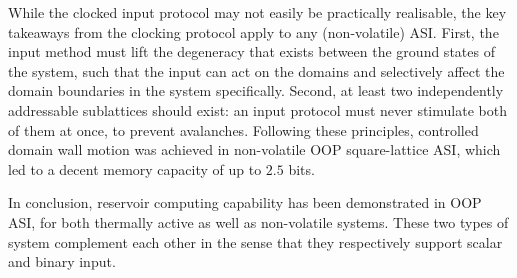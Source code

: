 While the clocked input protocol may not easily be practically realisable, the key takeaways from the clocking protocol apply to any (non-volatile) ASI.
First, the input method must lift the degeneracy that exists between the ground states of the system, such that the input can act on the domains and selectively affect the domain boundaries in the system specifically.
Second, at least two independently addressable sublattices should exist: an input protocol must never stimulate both of them at once, to prevent avalanches.
Following these principles, controlled domain wall motion was achieved in non-volatile OOP square-lattice ASI, which led to a decent memory capacity of up to $2.5$ bits. \par
In conclusion, reservoir computing capability has been demonstrated in OOP ASI, for both thermally active as well as non-volatile systems.
These two types of system complement each other in the sense that they respectively support scalar and binary input.
